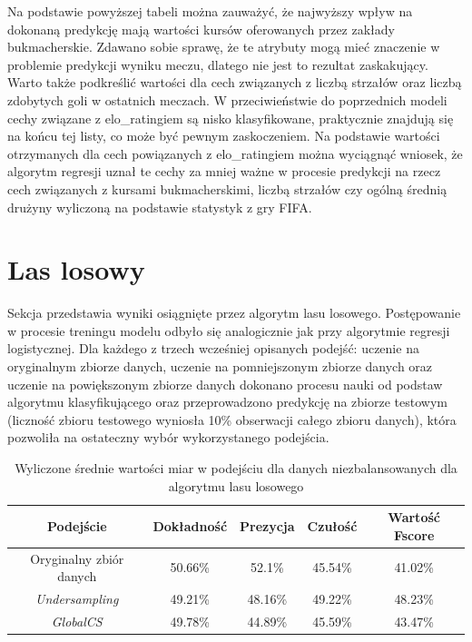 Na podstawie powyższej tabeli można zauważyć, że najwyższy wpływ na dokonaną predykcję mają wartości kursów oferowanych przez zakłady bukmacherskie. Zdawano sobie sprawę, że te atrybuty mogą mieć znaczenie w problemie predykcji wyniku meczu, dlatego nie jest to rezultat zaskakujący. Warto także podkreślić wartości dla cech związanych z liczbą strzałów oraz liczbą zdobytych goli w ostatnich meczach. W przeciwieństwie do poprzednich modeli cechy związane z elo\_ratingiem są nisko klasyfikowane, praktycznie znajdują się na końcu tej listy, co może być pewnym zaskoczeniem. Na podstawie wartości otrzymanych dla cech powiązanych z elo\_ratingiem można wyciągnąć wniosek, że algorytm regresji uznał te cechy za mniej ważne w procesie predykcji na rzecz cech związanych z kursami bukmacherskimi, liczbą strzałów czy ogólną średnią drużyny wyliczoną na podstawie statystyk z gry FIFA.

\section{Las losowy}
\label{resultsRF}
\noindent Sekcja przedstawia  wyniki osiągnięte przez algorytm lasu losowego. Postępowanie w procesie treningu modelu odbyło się analogicznie jak przy algorytmie regresji logistycznej. Dla każdego z trzech wcześniej opisanych podejść: uczenie na oryginalnym zbiorze danych, uczenie na pomniejszonym zbiorze danych oraz uczenie na powiększonym zbiorze danych dokonano procesu nauki od podstaw algorytmu klasyfikującego oraz przeprowadzono predykcję na zbiorze testowym (liczność zbioru testowego wyniosła 10\% obserwacji całego zbioru danych), która pozwoliła na ostateczny wybór wykorzystanego podejścia.

\begin{table}[H]
    \centering
    \caption{Wyliczone średnie wartości miar w podejściu dla danych niezbalansowanych dla algorytmu lasu losowego}
    \label{tab:LRSampling}
    \begin{tabular}{| c | c | c | c | c |}
    \hline
        Podejście & Dokładność & Prezycja & Czułość & Wartość Fscore \\ \hline 
        \hline
        Oryginalny zbiór danych & 50.66\% & 52.1\% & 45.54\% & 41.02\% \\
        \hline
        \textit{Undersampling} & 49.21\% & 48.16\% & 49.22\% & 48.23\% \\
        \hline
        \textit{GlobalCS} & 49.78\% & 44.89\% & 45.59\% & 43.47\% \\
         \hline
    \end{tabular}
\end{table}

